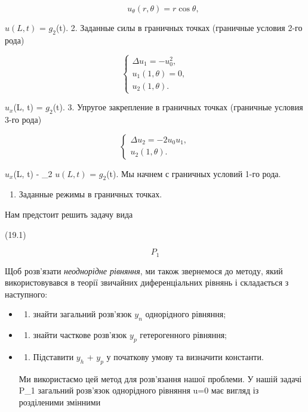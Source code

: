 \documentclass[
  ukrainian,
]{article}
\providecommand{\tightlist}{%
  \setlength{\itemsep}{0pt}\setlength{\parskip}{0pt}}
\begin{document}
\[
\qquad u_{\theta}(r, \theta) = r \cos \theta,
\]

\(u(L, t)\) = \(g_2\)(t). 2. Заданные силы в граничных точках (граничные
условия 2-го рода)

\[
\begin{cases} \Delta u_{1} = -u_{0}^{2}, \\ u_{1}(1, \theta) = 0, \\ u_{2}(1, \theta). \end{cases}
\]

\(u_x\)(L, t) = \(g_2\)(t). 3. Упругое закрепление в граничных точках
(граничные условия 3-го рода)

\[
\begin{cases} \Delta u_{2} = -2u_{0}u_{1}, \\ u_{2}(1, \theta). \end{cases}
\]

\(u_x\)(L, t) - \gamma\_2 \(u(L, t)\) = \(g_2\)(t). Мы начнем с
граничных условий 1-го рода.

\begin{enumerate}
\def\labelenumi{\arabic{enumi}.}
\tightlist
\item
  Заданные режимы в граничных точках.
\end{enumerate}

Нам предстоит решить задачу вида

(19.1)

\[
P_{1}
\]

Щоб розв'язати \emph{неоднорідне рівняння}, ми також звернемося до
методу, який використовувався в теорії звичайних диференціальних рівнянь
і складається з наступного:

\begin{itemize}
\item
  \begin{enumerate}
  \def\labelenumi{\arabic{enumi})}
  \tightlist
  \item
    знайти загальний розв'язок \(y_n\) однорідного рівняння;
  \end{enumerate}
\item
  \begin{enumerate}
  \def\labelenumi{\arabic{enumi})}
  \setcounter{enumi}{1}
  \tightlist
  \item
    знайти часткове розв'язок \(y_p\) гетерогенного рівняння;
  \end{enumerate}
\item
  \begin{enumerate}
  \def\labelenumi{\arabic{enumi})}
  \setcounter{enumi}{2}
  \tightlist
  \item
    Підставити \(y_h\) + \(y_p\) у початкову умову та визначити
    константи.
  \end{enumerate}

  Ми використаємо цей метод для розв'язання нашої проблеми. У нашій
  задачі P\_1 загальний розв'язок однорідного рівняння \Delta u=0 має
  вигляд із розділеними змінними
\end{itemize}
\end{document}
